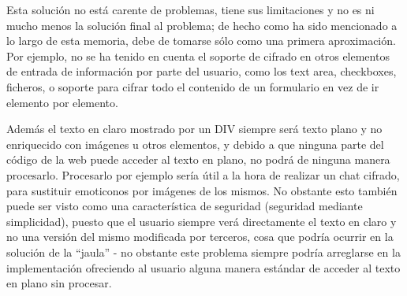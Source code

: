 Esta solución no está carente de problemas, tiene sus limitaciones y no es ni mucho menos la solución final al problema; de hecho como ha sido mencionado a lo largo de esta memoria, debe de tomarse sólo como una primera aproximación. Por ejemplo, no se ha tenido en cuenta el soporte de cifrado en otros elementos de entrada de información por parte del usuario, como los text area, checkboxes, ficheros, o soporte para cifrar todo el contenido de un formulario en vez de ir elemento por elemento.

Además el texto en claro mostrado por un DIV siempre será texto plano y no enriquecido con imágenes u otros elementos, y debido a que ninguna parte del código de la web puede acceder al texto en plano, no podrá de ninguna manera procesarlo. Procesarlo por ejemplo sería útil a la hora de realizar un chat cifrado, para sustituir emoticonos por imágenes de los mismos. No obstante esto también puede ser visto como una característica de seguridad (seguridad mediante simplicidad), puesto que el usuario siempre verá directamente el texto en claro y no una versión del mismo modificada por terceros, cosa que podría ocurrir en la solución de la ``jaula'' - no obstante este problema siempre podría arreglarse en la implementación ofreciendo al usuario alguna manera estándar de acceder al texto en plano sin procesar.


